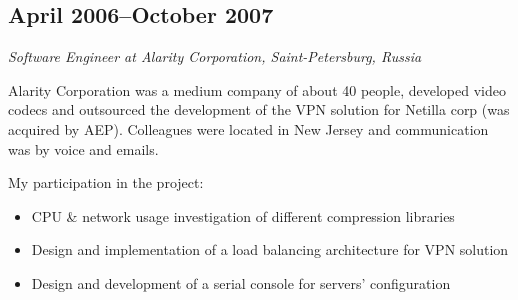 \subsection*{April 2006--October 2007}

\textit{Software Engineer at Alarity Corporation, Saint-Petersburg, Russia}

Alarity Corporation was a medium company of about 40 people, developed video codecs 
and outsourced the development of the VPN solution for Netilla corp (was acquired by AEP).
Colleagues were located in New Jersey and communication was by voice and emails.

My participation in the project:
\begin{itemize}[noitemsep, nosep]
  \item CPU \& network usage investigation of different compression libraries
  \item Design and implementation of a load balancing architecture for VPN solution
  \item Design and development of a serial console for servers' configuration
\end{itemize}
